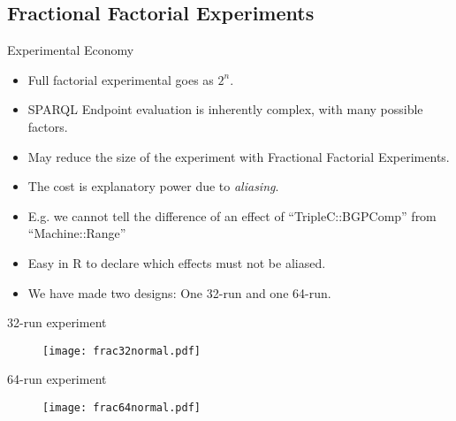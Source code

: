 \documentclass[english,handout,aspectratio=169]{ifislide}
\begin{document}
\subsection{Fractional Factorial Experiments}

\begin{frame}{Experimental Economy}

  \begin{itemize}
  \item Full factorial experimental goes as $2^n$.
  \item SPARQL Endpoint evaluation is inherently complex, with many
    possible factors.
  \item May reduce the size of the experiment with Fractional
    Factorial Experiments.
  \item The cost is explanatory power due to \emph{aliasing}.
  \item E.g. we cannot tell the difference of an effect of
    ``TripleC::BGPComp'' from ``Machine::Range''
  \item Easy in R to declare which effects must not be aliased.
  \item We have made two designs: One 32-run and one 64-run.
  \end{itemize}
  
\end{frame}

\begin{frame}{32-run experiment}
\begin{figure}[ht!]
  \centerline{%
    \texttt{[image: frac32normal.pdf]}}
  \label{fig:frac32normal}
\end{figure}
 
\end{frame}

\begin{frame}{64-run experiment}
\begin{figure}[ht!]
  \centerline{%
    \texttt{[image: frac64normal.pdf]}}
\end{figure}


\end{frame}
\end{document}
